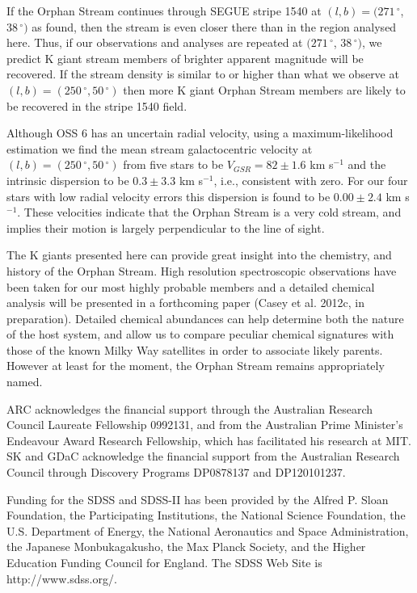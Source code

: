 \documentclass{emulateapj}
\begin{document}
If the Orphan Stream continues through SEGUE stripe 1540 at $(l, b) = (271\,^\circ$, $38\,^\circ)$ as \citet{Newberg;et-al_2010} found, then the stream is even closer there than in the region analysed here. Thus, if our observations and analyses are repeated at $(271\,^\circ$, $38\,^\circ)$, we predict K giant stream members of brighter apparent magnitude will be recovered. If the stream density is similar to or higher than what we observe at $(l, b) = (250\,^\circ, 50\,^\circ)$ then more K giant Orphan Stream members are likely to be recovered in the stripe 1540 field.

Although OSS 6 has an uncertain radial velocity, using a maximum-likelihood estimation we find the mean stream galactocentric velocity at $(l, b) = (250\,^\circ, 50\,^\circ)$ from five stars to be $V_{GSR} = 82 \pm 1.6$ km s$^{-1}$ and the intrinsic dispersion to be $0.3 \pm 3.3$ km s$^{-1}$, i.e., consistent with zero. For our four stars with low radial velocity errors this dispersion is found to be $0.00 \pm 2.4$ km s$^{-1}$. These velocities indicate that the Orphan Stream is a very cold stream, and implies their motion is largely perpendicular to the line of sight.

The K giants presented here can provide great insight into the chemistry, and history of the Orphan Stream. High resolution spectroscopic observations have been taken for our most highly probable members and a detailed chemical analysis will be presented in a forthcoming paper (Casey et al. 2012c, in preparation). Detailed chemical abundances can help determine both the nature of the host system, and allow us to compare peculiar chemical signatures with those of the known Milky Way satellites in order to associate likely parents. However at least for the moment, the Orphan Stream remains appropriately named.


\acknowledgements
ARC acknowledges the financial support through the Australian Research Council Laureate Fellowship 0992131, and from the Australian Prime Minister's Endeavour Award Research Fellowship, which has facilitated his research at MIT. SK and GDaC acknowledge the financial support from the Australian Research Council through Discovery Programs DP0878137 and DP120101237.

Funding for the SDSS and SDSS-II has been provided by the Alfred P. Sloan Foundation, the Participating Institutions, the National Science Foundation, the U.S. Department of Energy, the National Aeronautics and Space Administration, the Japanese Monbukagakusho, the Max Planck Society, and the Higher Education Funding Council for England. The SDSS Web Site is http://www.sdss.org/.
\end{document}
